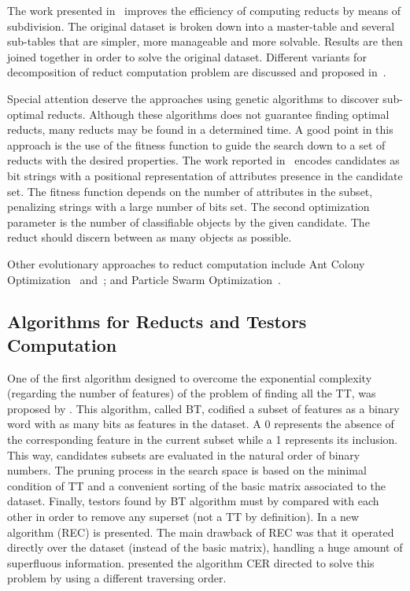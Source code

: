 \documentclass[authoryear,11pt]{elsarticle}
\begin{document}
  The work presented in~\citep{Jiao10} improves the efficiency of computing reducts by means of subdivision. The 
  original dataset is broken down into a master-table and several sub-tables that are simpler, more manageable 
  and more solvable. Results are then joined together in order to solve the original dataset. Different variants
  for decomposition of reduct computation problem are discussed and proposed in~\citep{Strakowski08}.
  
  Special attention deserve the approaches using genetic algorithms to discover sub-optimal reducts. Although 
  these algorithms does not guarantee finding optimal reducts, many reducts may be found in a determined time.
  A good point in this approach is the use of the fitness function to guide the search down to a set of 
  reducts with the desired properties. The work reported in~\citep{Wroblewski95} encodes candidates as bit 
  strings with a positional representation of attributes presence in the candidate set. The fitness function
  depends on the number of attributes in the subset, penalizing strings with a large number of bits set. The 
  second optimization parameter is the number of classifiable objects by the given candidate. The reduct should 
  discern between as many objects as possible.
  
  Other evolutionary approaches to reduct computation include Ant Colony Optimization~\citep{Jensen03}
  and~\citep{Chen10}; and Particle Swarm Optimization~\citep{Wang07}.
    
\subsection{Algorithms for Reducts and Testors Computation}
  One of the first algorithm designed to overcome the exponential complexity (regarding
  the number of features) of the problem of finding all the TT, was 
  proposed by \cite{Ruiz85}. This algorithm, called BT,
  codified a subset of features as a binary word with as many bits as features in the 
  dataset. A 0 represents the absence of the corresponding feature in the current
  subset while a 1 represents its inclusion. This way, candidates subsets are evaluated
  in the natural order of binary numbers. The pruning process in the
  search space is based on the minimal condition of TT and a convenient sorting
  of the basic matrix associated to the dataset. Finally, 
  testors found by BT algorithm must by compared with each other in order to remove
  any superset (not a TT by definition).
  In \citep{Shulcloper95b} a new algorithm (REC) is presented.
  The main drawback of REC was that it operated directly over the dataset (instead of the
  basic matrix), handling a huge amount of superfluous information. \cite{Ayaquica97}
  presented the algorithm CER directed to solve this problem by using a different traversing
  order. 
	
\end{document}
